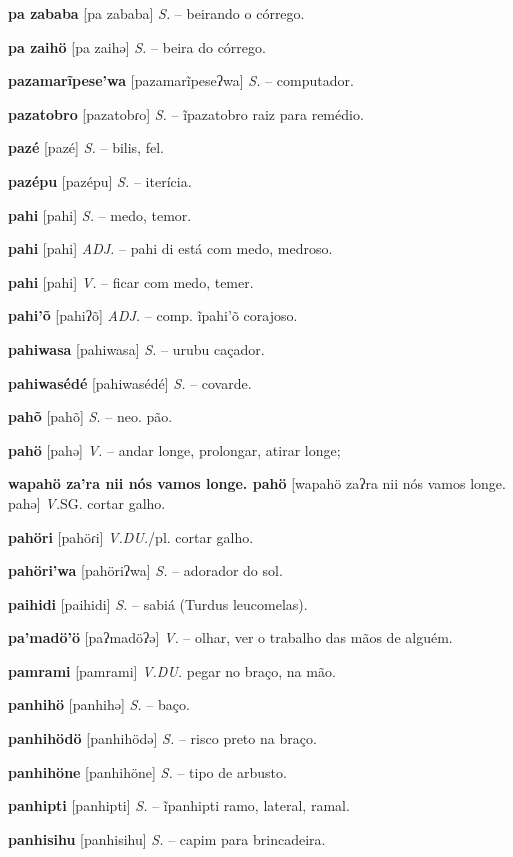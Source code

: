 \textbf{pa zababa} [pa zababa] \textit{S.} -- beirando o córrego.

\textbf{pa zaihö} [pa zaihə] \textit{S.} -- beira do córrego.

\textbf{pazamarĩpese'wa} [pazamarĩpeseʔwa] \textit{S.} -- computador.

\textbf{pazatobro} [pazatobɾo] \textit{S.} -- ĩpazatobro raiz para remédio.

\textbf{pazé} [pazé] \textit{S.} -- bilis, fel.

\textbf{pazépu} [pazépu] \textit{S.} -- iterícia.

\textbf{pahi} [pahi] \textit{S.} -- medo, temor.

\textbf{pahi} [pahi] \textit{ADJ.} -- pahi di está com medo, medroso.

\textbf{pahi} [pahi] \textit{V.} -- ficar com medo, temer.

\textbf{pahi'õ} [pahiʔõ] \textit{ADJ.} -- comp. ĩpahi'õ corajoso.

\textbf{pahiwasa} [pahiwasa] \textit{S.} -- urubu caçador.

\textbf{pahiwasédé} [pahiwasédé] \textit{S.} -- covarde.

\textbf{pahõ} [pahõ] \textit{S.} -- neo. pão.

\textbf{pahö} [pahə] \textit{V.} -- andar longe, prolongar, atirar longe;

\textbf{wapahö za'ra nii nós vamos longe. pahö} [wapahö zaʔra nii nós vamos longe. pahə] \textit{V.}SG. cortar galho.

\textbf{pahöri} [pahöɾi] \textit{V.DU.}/pl. cortar galho.

\textbf{pahöri'wa} [pahöriʔwa] \textit{S.} -- adorador do sol.

\textbf{paihidi} [paihidi] \textit{S.} -- sabiá (Turdus leucomelas).

\textbf{pa'madö'ö} [paʔmadöʔə] \textit{V.} -- olhar, ver o trabalho das mãos de alguém.

\textbf{pamrami} [pamrami] \textit{V.DU.} pegar no braço, na mão.

\textbf{panhihö} [panhihə] \textit{S.} -- baço.

\textbf{panhihödö} [panhihödə] \textit{S.} -- risco preto na braço.

\textbf{panhihöne} [panhihöne] \textit{S.} -- tipo de arbusto.

\textbf{panhipti} [panhipti] \textit{S.} -- ĩpanhipti ramo, lateral, ramal.

\textbf{panhisihu} [panhisihu] \textit{S.} -- capim para brincadeira.

